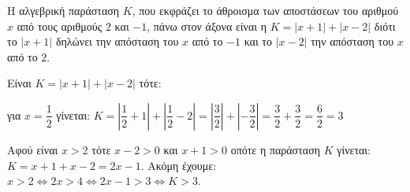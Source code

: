 
\begin{alist}
\item Η αλγεβρική παράσταση $K$, που εκφράζει το άθροισμα των αποστάσεων του αριθμού $x$ από
τους αριθμούς $2$ και $-1$, πάνω στον άξονα είναι η $K = |x + 1| + |x - 2|$ διότι το $|x + 1|$ δηλώνει
την απόσταση του $x$ από το $-1$ και το $|x - 2|$ την απόσταση του $x$ από το $2$.

\item Είναι $K = |x + 1| + |x - 2|$ τότε:
\begin{rlist}
\item για $x = \dfrac{1}{2}$ γίνεται: $K = \left|\dfrac{1}{2} + 1\right| + \left|\dfrac{1}{2} - 2\right| = \left|\dfrac{3}{2}\right| + \left|-\dfrac{3}{2}\right| = \dfrac{3}{2} + \dfrac{3}{2} = \dfrac{6}{2} = 3$

\item Αφού είναι $x > 2$ τότε $x - 2 > 0$ και $x + 1 > 0$ οπότε η παράσταση $K$ γίνεται:
$K = x + 1 + x - 2 = 2x - 1$.
Ακόμη έχουμε: $x > 2 \Leftrightarrow 2x > 4 \Leftrightarrow 2x - 1 > 3 \Leftrightarrow K > 3$.
\end{rlist}
\end{alist}

